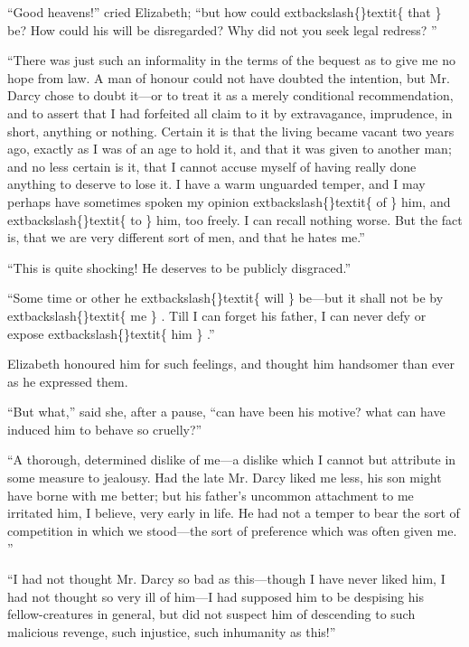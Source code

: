 \documentclass[10pt]{book}
\begin{document}
   “Good heavens!” cried Elizabeth; “but how could
   	extbackslash\{\}textit\{
    that
   \}
   be? How could his
will be disregarded? Why did not you seek legal redress?
   ”
  

   “There was just such an informality in the terms of the bequest as to
give me no hope from law. A man of honour could not have doubted the
intention, but Mr. Darcy chose to doubt it—or to treat it as a merely
conditional recommendation, and to assert that I had forfeited all claim
to it by extravagance, imprudence, in short, anything or nothing.
Certain it is that the living became vacant two years ago, exactly as I
was of an age to hold it, and that it was given to another man; and no
less certain is it, that I cannot accuse myself of having really done
anything to deserve to lose it. I have a warm unguarded temper, and I
may perhaps have sometimes spoken my opinion
   	extbackslash\{\}textit\{
    of
   \}
   him, and
   	extbackslash\{\}textit\{
    to
   \}
   him, too
freely. I can recall nothing worse. But the fact is, that we are very
different sort of men, and that he hates me.”
  

   “This is quite shocking! He deserves to be publicly disgraced.”
  

   “Some time or other he
   	extbackslash\{\}textit\{
    will
   \}
   be—but it shall not be by
   	extbackslash\{\}textit\{
    me
   \}
   . Till I
can forget his father, I can never defy or expose
   	extbackslash\{\}textit\{
    him
   \}
   .”
  

   Elizabeth honoured him for such feelings, and thought him handsomer than
ever as he expressed them.
  

   “But what,” said she, after a pause, “can have been his motive? what can
have induced him to behave so cruelly?”
  

   “A thorough, determined dislike of me—a dislike which I cannot but
attribute in some measure to jealousy. Had the late Mr. Darcy liked me
less, his son might have borne with me better; but his father’s uncommon
attachment to me irritated him, I believe, very early in life. He had
not a temper to bear the sort of competition in which we stood—the sort
of preference which was often given me.
   ”
  

   “I had not thought Mr. Darcy so bad as this—though I have never liked
him, I had not thought so very ill of him—I had supposed him to be
despising his fellow-creatures in general, but did not suspect him of
descending to such malicious revenge, such injustice, such inhumanity as
this!”
  
\end{document}
